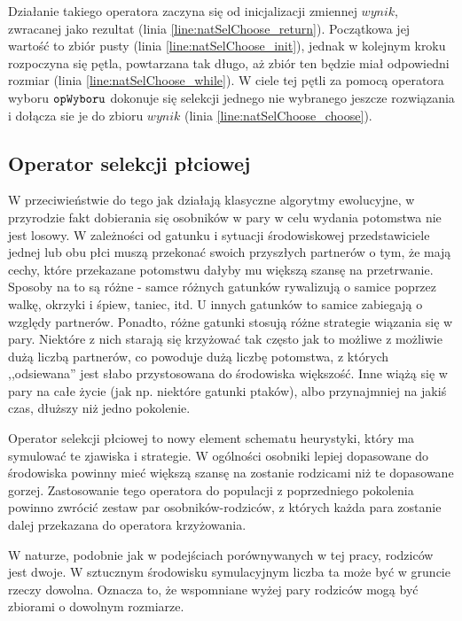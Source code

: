 \documentclass[./FM_mgr.tex]{subfiles}
\begin{document}
Działanie takiego operatora zaczyna się od inicjalizacji zmiennej $wynik$, zwracanej jako rezultat (linia \ref{line:natSelChoose_return}). 
Początkowa jej wartość to zbiór pusty (linia \ref{line:natSelChoose_init}), jednak w kolejnym kroku rozpoczyna się pętla, powtarzana tak długo, aż zbiór ten będzie miał odpowiedni rozmiar (linia \ref{line:natSelChoose_while}).
W ciele tej pętli za pomocą operatora wyboru $\mathtt{opWyboru}$ dokonuje się selekcji jednego nie wybranego jeszcze rozwiązania i dołącza sie je do zbioru $wynik$ (linia \ref{line:natSelChoose_choose}).

\subsection{Operator selekcji płciowej} \label{subsection:new_genSel}

W przeciwieństwie do tego jak działają klasyczne algorytmy ewolucyjne, w przyrodzie fakt dobierania się osobników w pary w celu wydania potomstwa nie jest losowy.
W zależności od gatunku i sytuacji środowiskowej przedstawiciele jednej lub obu płci muszą przekonać swoich przyszłych partnerów o tym, że mają cechy, które przekazane potomstwu dałyby mu większą szansę na przetrwanie.
Sposoby na to są różne - samce różnych gatunków rywalizują o samice poprzez walkę, okrzyki i śpiew, taniec, itd. 
U innych gatunków to samice zabiegają o względy partnerów.
Ponadto, różne gatunki stosują różne strategie wiązania się w pary.
Niektóre z nich starają się krzyżować tak często jak to możliwe z możliwie dużą liczbą partnerów, co powoduje dużą liczbę potomstwa, z których ,,odsiewana'' jest słabo przystosowana do środowiska większość.
Inne wiążą się w pary na całe życie (jak np. niektóre gatunki ptaków), albo przynajmniej na jakiś czas, dłuższy niż jedno pokolenie.

Operator selekcji płciowej to nowy element schematu heurystyki, który ma symulować te zjawiska i strategie.
W ogólności osobniki lepiej dopasowane do środowiska powinny mieć większą szansę na zostanie rodzicami niż te dopasowane gorzej.
Zastosowanie tego operatora do populacji z poprzedniego pokolenia powinno zwrócić zestaw par osobników-rodziców, z których każda para zostanie dalej przekazana do operatora krzyżowania.

W naturze, podobnie jak w podejściach porównywanych w tej pracy, rodziców jest dwoje. 
W sztucznym środowisku symulacyjnym liczba ta może być w gruncie rzeczy dowolna. 
Oznacza to, że wspomniane wyżej pary rodziców mogą być zbiorami o dowolnym rozmiarze.
\end{document}
